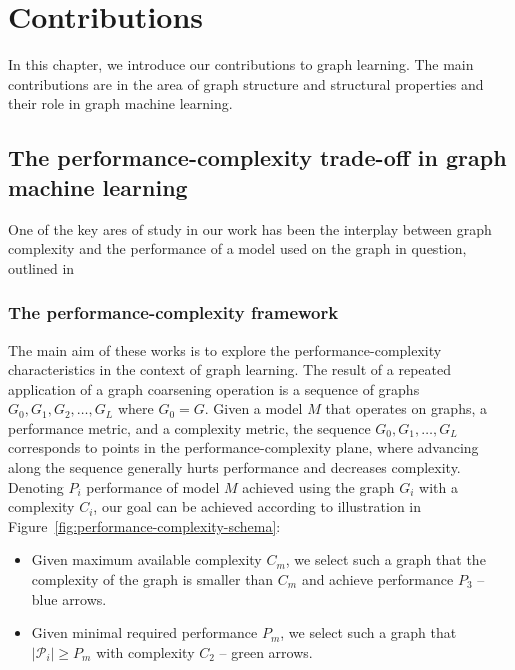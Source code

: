 \chapter{Contributions}
\label{chap:my-research}

In this chapter, we introduce our contributions to graph learning. The main contributions are in the area of graph structure and structural properties and their role in graph machine learning.


\section{The performance-complexity trade-off in graph machine learning}

One of the key ares of study in our work has been the interplay between graph complexity and the performance of a model used on the graph in question, outlined in \cite{prochazka_scalable_2022, dedic_balancing_2023, dedic_balancing_2024}

\subsection{The performance-complexity framework}

The main aim of these works is to explore the performance-complexity characteristics in the context of graph learning. The result of a repeated application of a graph coarsening operation is a sequence of graphs \( G_0, G_1, G_2, \dots, G_L \) where \( G_0 = G \).
Given a model \( M \) that operates on graphs, a performance metric, and a complexity metric, the sequence \( G_0, G_1, \dots, G_L \) corresponds to points in the performance-complexity plane, where advancing along the sequence generally hurts performance and decreases complexity. Denoting $P_i$ performance of model $M$ achieved using the graph $G_i$ with a complexity \( C_i \), our goal can be achieved according to illustration in Figure~\ref{fig:performance-complexity-schema}:
\begin{itemize}
    \item Given maximum available complexity $C_m$, we select such a graph that the complexity of the graph is smaller than $C_m$ and achieve performance $P_3$ -- blue arrows.
    \item Given minimal required performance $P_m$, we select such a graph that $|\mathcal{P}_i|\ge P_m$ with complexity $C_2$ -- green arrows.
\end{itemize}

